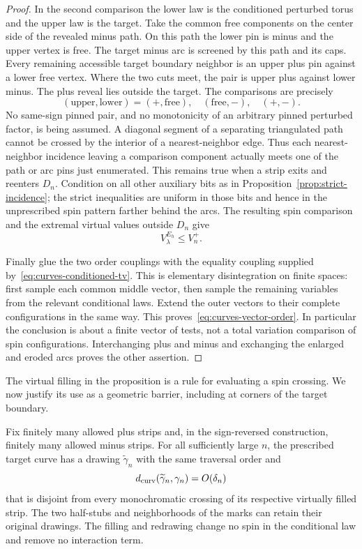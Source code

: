 \begin{proof}
In the second comparison the lower law is the conditioned perturbed
torus and the upper law is the target.  Take the common free components
on the center side of the revealed minus path.  On this path the lower
pin is minus and the upper vertex is free.  The target minus arc is
screened by this path and its caps.  Every remaining accessible target
boundary neighbor is an upper plus pin against a lower free vertex.
Where the two cuts meet, the pair is upper plus against lower minus.
The plus reveal lies outside the target.  The comparisons are precisely
\[
 (\text{upper},\text{lower})=(+,\text{free}),\quad
 (\text{free},-),\quad (+,-).
\]
No same-sign pinned pair, and no monotonicity of an arbitrary pinned
perturbed factor, is being assumed.  A diagonal segment of a separating
triangulated path cannot be crossed by the interior of a nearest-neighbor
edge.  Thus each nearest-neighbor incidence leaving a comparison
component actually meets one of the path or arc pins just enumerated.
This remains true when a strip exits and reenters $D_n$.  Condition on
all other auxiliary bits as in Proposition~\ref{prop:strict-incidence};
the strict inequalities are uniform in those bits and hence in the
unprescribed spin pattern farther behind the arcs.  The resulting spin
comparison and the extremal virtual values outside $D_n$ give
\[
 V_\lambda^{E_h}\leq V_n^+.
\]

Finally glue the two order couplings with the equality coupling supplied
by~\eqref{eq:curves-conditioned-tv}.  This is elementary disintegration
on finite spaces: first sample each common middle vector, then sample
the remaining variables from the relevant conditional laws.  Extend the
outer vectors to their complete configurations in the same way.  This
proves~\eqref{eq:curves-vector-order}.  In particular the conclusion is
about a finite vector of tests, not a total variation comparison of spin
configurations.  Interchanging plus and minus and exchanging the
enlarged and eroded arcs proves the other assertion.
\end{proof}

The virtual filling in the proposition is a rule for evaluating a spin
crossing.  We now justify its use as a geometric barrier, including at
corners of the target boundary.

\begin{lemma}
\label{lem:curves-local-barrier}
Fix finitely many allowed plus strips and, in the sign-reversed
construction, finitely many allowed minus strips.  For all sufficiently
large $n$, the prescribed target curve has a drawing $\widetilde\gamma_n$
with the same traversal order and
\[
 d_{\rm curv}(\widetilde\gamma_n,\gamma_n)=O(\delta_n)
\]
that is disjoint from every monochromatic crossing of its respective
virtually filled strip.  The two half-stubs and neighborhoods of the
marks can retain their original drawings.  The filling and redrawing
change no spin in the conditional law and remove no interaction term.
\end{lemma}

